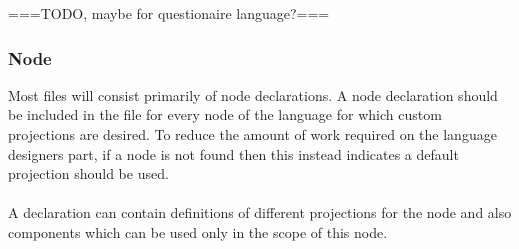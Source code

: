 \documentclass{article}
\begin{document}
===TODO, maybe for questionaire language?===

\subsubsection{Node}

Most files will consist primarily of node declarations. A node declaration should be included in the file for every node of the language for which custom projections are desired. To reduce the amount of work required on the language designers part, if a node is not found then this instead indicates a default projection should be used. 
\\
\\
A declaration can contain definitions of different projections for the node and also components which can be used only in the scope of this node.
\end{document}
